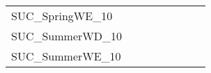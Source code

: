 \begin{table}[H]
{\begin{tabular}{|l|ll|ll|l|l|l|}
			SUC\_SpringWE\_10              &                                 &                                &                                  &                                 &                                    &                            &                            \\
			SUC\_SummerWD\_10              &                                 &                                &                                  &                                 &                                    &                            &                            \\
			SUC\_SummerWE\_10              &                                 &                                &                                  &                                 &                                    &                            &                            \\ \hline
		\end{tabular}%
	}
\end{table}

